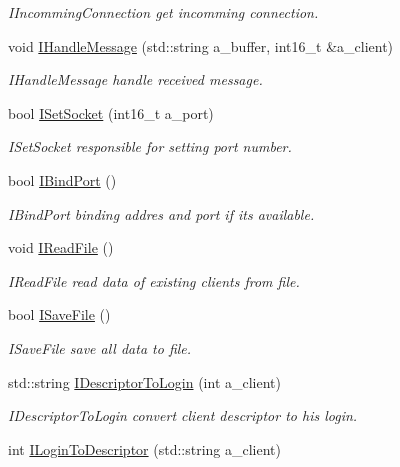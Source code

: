 \begin{DoxyCompactItemize}
\begin{DoxyCompactList}\small\item\em I\+Incomming\+Connection get incomming connection. \end{DoxyCompactList}\item 
void \hyperlink{classServer_a3fc09fa8b4132eacacef7e3473473845}{I\+Handle\+Message} (std\+::string a\+\_\+buffer, int16\+\_\+t \&a\+\_\+client)
\begin{DoxyCompactList}\small\item\em I\+Handle\+Message handle received message. \end{DoxyCompactList}\item 
bool \hyperlink{classServer_a80089a729a3664bf580c27ae5a86d691}{I\+Set\+Socket} (int16\+\_\+t a\+\_\+port)
\begin{DoxyCompactList}\small\item\em I\+Set\+Socket responsible for setting port number. \end{DoxyCompactList}\item 
bool \hyperlink{classServer_a4d95b9a38864072084277bb84421475e}{I\+Bind\+Port} ()
\begin{DoxyCompactList}\small\item\em I\+Bind\+Port binding addres and port if it\textquotesingle{}s available. \end{DoxyCompactList}\item 
void \hyperlink{classServer_adc80cd989752eccc1fdd81edaf8be4af}{I\+Read\+File} ()
\begin{DoxyCompactList}\small\item\em I\+Read\+File read data of existing clients from file. \end{DoxyCompactList}\item 
bool \hyperlink{classServer_aa598d1dba8b8a0c6a4b75be14726798a}{I\+Save\+File} ()
\begin{DoxyCompactList}\small\item\em I\+Save\+File save all data to file. \end{DoxyCompactList}\item 
std\+::string \hyperlink{classServer_ac3697709d2f04345928e0ee2ec2b71d0}{I\+Descriptor\+To\+Login} (int a\+\_\+client)
\begin{DoxyCompactList}\small\item\em I\+Descriptor\+To\+Login convert client descriptor to his login. \end{DoxyCompactList}\item 
int \hyperlink{classServer_a1e9fccb595bba3c40bf11485e369eae4}{I\+Login\+To\+Descriptor} (std\+::string a\+\_\+client)

\end{DoxyCompactItemize}
